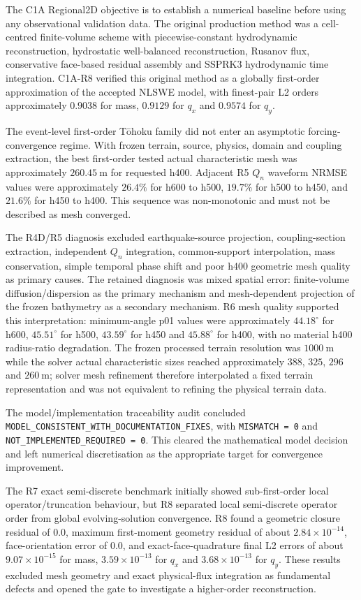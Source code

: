 The C1A Regional2D objective is to establish a numerical baseline before
using any observational validation data. The original production method
was a cell-centred finite-volume scheme with piecewise-constant
hydrodynamic reconstruction, hydrostatic well-balanced reconstruction,
Rusanov flux, conservative face-based residual assembly and SSPRK3
hydrodynamic time integration. C1A-R8 verified this original method as a
globally first-order approximation of the accepted NLSWE model, with
finest-pair L2 orders approximately $0.9038$ for mass, $0.9129$ for
$q_x$ and $0.9574$ for $q_y$.

The event-level first-order Tōhoku family did not enter an asymptotic
forcing-convergence regime. With frozen terrain, source, physics,
domain and coupling extraction, the best first-order tested actual
characteristic mesh was approximately $260.45~\mathrm{m}$ for requested
h400. Adjacent R5 $Q_n$ waveform NRMSE values were approximately
$26.4\%$ for h600 to h500, $19.7\%$ for h500 to h450, and $21.6\%$ for
h450 to h400. This sequence was non-monotonic and must not be described
as mesh converged.

The R4D/R5 diagnosis excluded earthquake-source projection,
coupling-section extraction, independent $Q_n$ integration,
common-support interpolation, mass conservation, simple temporal phase
shift and poor h400 geometric mesh quality as primary causes. The
retained diagnosis was mixed spatial error: finite-volume
diffusion/dispersion as the primary mechanism and mesh-dependent
projection of the frozen bathymetry as a secondary mechanism. R6 mesh
quality supported this interpretation: minimum-angle p01 values were
approximately $44.18^\circ$ for h600, $45.51^\circ$ for h500,
$43.59^\circ$ for h450 and $45.88^\circ$ for h400, with no material
h400 radius-ratio degradation. The frozen processed terrain resolution
was $1000~\mathrm{m}$ while the solver actual characteristic sizes
reached approximately $388$, $325$, $296$ and $260~\mathrm{m}$; solver
mesh refinement therefore interpolated a fixed terrain representation
and was not equivalent to refining the physical terrain data.

The model/implementation traceability audit concluded
\texttt{MODEL\_CONSISTENT\_WITH\_DOCUMENTATION\_FIXES}, with
\texttt{MISMATCH = 0} and
\texttt{NOT\_IMPLEMENTED\_REQUIRED = 0}. This cleared the mathematical
model decision and left numerical discretisation as the appropriate
target for convergence improvement.

The R7 exact semi-discrete benchmark initially showed sub-first-order
local operator/truncation behaviour, but R8 separated local
semi-discrete operator order from global evolving-solution convergence.
R8 found a geometric closure residual of $0.0$, maximum first-moment
geometry residual of about $2.84\times10^{-14}$, face-orientation error
of $0.0$, and exact-face-quadrature final L2 errors of about
$9.07\times10^{-15}$ for mass, $3.59\times10^{-13}$ for $q_x$ and
$3.68\times10^{-13}$ for $q_y$. These results excluded mesh geometry
and exact physical-flux integration as fundamental defects and opened
the gate to investigate a higher-order reconstruction.

